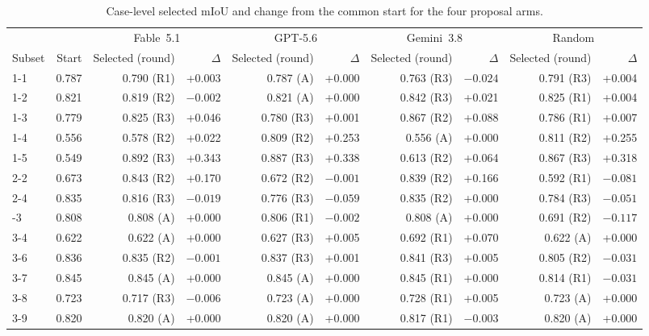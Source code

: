 \documentclass[a4paper,fleqn]{cas-dc}
\begin{document}
\begin{table}[t]
\caption{Case-level selected mIoU and change from the common start for the four proposal arms.}\label{tab:poc-selection-rounds}
\centering
\scriptsize
\setlength{\tabcolsep}{2.5pt}
\begin{tabular*}{\textwidth}{@{\extracolsep{\fill}} l r rr rr rr rr}
\toprule
& & \multicolumn{2}{c}{Fable~5.1} & \multicolumn{2}{c}{GPT-5.6} & \multicolumn{2}{c}{Gemini~3.8} & \multicolumn{2}{c}{Random} \\
\cmidrule(lr){3-4}\cmidrule(lr){5-6}\cmidrule(lr){7-8}\cmidrule(lr){9-10}
Subset & Start & Selected (round) & $\Delta$ & Selected (round) & $\Delta$ & Selected (round) & $\Delta$ & Selected (round) & $\Delta$ \\
\midrule
1-1 & 0.787 & 0.790 (R1) & +0.003 & 0.787 (A) & +0.000 & 0.763 (R3) & $-0.024$ & 0.791 (R3) & +0.004 \\
1-2 & 0.821 & 0.819 (R2) & $-0.002$ & 0.821 (A) & +0.000 & 0.842 (R3) & +0.021 & 0.825 (R1) & +0.004 \\
1-3 & 0.779 & 0.825 (R3) & +0.046 & 0.780 (R3) & +0.001 & 0.867 (R2) & +0.088 & 0.786 (R1) & +0.007 \\
1-4 & 0.556 & 0.578 (R2) & +0.022 & 0.809 (R2) & +0.253 & 0.556 (A) & +0.000 & 0.811 (R2) & +0.255 \\
1-5 & 0.549 & 0.892 (R3) & +0.343 & 0.887 (R3) & +0.338 & 0.613 (R2) & +0.064 & 0.867 (R3) & +0.318 \\
2-2 & 0.673 & 0.843 (R2) & +0.170 & 0.672 (R2) & $-0.001$ & 0.839 (R2) & +0.166 & 0.592 (R1) & $-0.081$ \\
2-4 & 0.835 & 0.816 (R3) & $-0.019$ & 0.776 (R3) & $-0.059$ & 0.835 (R2) & +0.000 & 0.784 (R3) & $-0.051$ \\
\addlinespace
3-3 & 0.808 & 0.808 (A) & +0.000 & 0.806 (R1) & $-0.002$ & 0.808 (A) & +0.000 & 0.691 (R2) & $-0.117$ \\
3-4 & 0.622 & 0.622 (A) & +0.000 & 0.627 (R3) & +0.005 & 0.692 (R1) & +0.070 & 0.622 (A) & +0.000 \\
3-6 & 0.836 & 0.835 (R2) & $-0.001$ & 0.837 (R3) & +0.001 & 0.841 (R3) & +0.005 & 0.805 (R2) & $-0.031$ \\
3-7 & 0.845 & 0.845 (A) & +0.000 & 0.845 (A) & +0.000 & 0.845 (R1) & +0.000 & 0.814 (R1) & $-0.031$ \\
3-8 & 0.723 & 0.717 (R3) & $-0.006$ & 0.723 (A) & +0.000 & 0.728 (R1) & +0.005 & 0.723 (A) & +0.000 \\
3-9 & 0.820 & 0.820 (A) & +0.000 & 0.820 (A) & +0.000 & 0.817 (R1) & $-0.003$ & 0.820 (A) & +0.000 \\

\end{tabular*}
\end{table}
\end{document}
